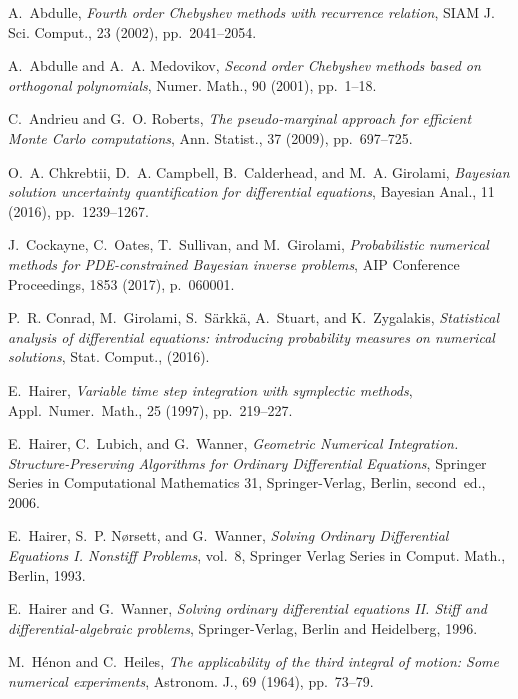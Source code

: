 \documentclass[10pt]{article}
\begin{document}
\def\cprime{$'$}
\begin{thebibliography}{10}
	
	{\sc A.~Abdulle}, {\em Fourth order {C}hebyshev methods with recurrence
		relation}, SIAM J. Sci. Comput., 23 (2002), pp.~2041--2054.
	
	{\sc A.~Abdulle and A.~A. Medovikov}, {\em Second order {C}hebyshev methods
		based on orthogonal polynomials}, Numer. Math., 90 (2001), pp.~1--18.
	
	{\sc C.~Andrieu and G.~O. Roberts}, {\em The pseudo-marginal approach for
		efficient {M}onte {C}arlo computations}, Ann. Statist., 37 (2009),
	pp.~697--725.
	
	{\sc O.~A. Chkrebtii, D.~A. Campbell, B.~Calderhead, and M.~A. Girolami}, {\em
		Bayesian solution uncertainty quantification for differential equations},
	Bayesian Anal., 11 (2016), pp.~1239--1267.
	
	{\sc J.~Cockayne, C.~Oates, T.~Sullivan, and M.~Girolami}, {\em Probabilistic
		numerical methods for {PDE}-constrained {B}ayesian inverse problems}, AIP
	Conference Proceedings, 1853 (2017), p.~060001.
	
	{\sc P.~R. Conrad, M.~Girolami, S.~S{\"a}rkk{\"a}, A.~Stuart, and
		K.~Zygalakis}, {\em Statistical analysis of differential equations:
		introducing probability measures on numerical solutions}, Stat. Comput.,
	(2016).
	
	{\sc E.~Hairer}, {\em Variable time step integration with symplectic methods},
	Appl.\ Numer.\ Math., 25 (1997), pp.~219--227.
	
	{\sc E.~Hairer, C.~Lubich, and G.~Wanner}, {\em Geometric Numerical
		Integration. Structure-Preserving Algorithms for Ordinary Differential
		Equations}, Springer Series in Computational Mathematics 31, Springer-Verlag,
	Berlin, second~ed., 2006.
	
	{\sc E.~Hairer, S.~P. N{\o{}}rsett, and G.~Wanner}, {\em Solving Ordinary
		Differential Equations I. Nonstiff Problems}, vol.~8, Springer Verlag Series
	in Comput. Math., Berlin, 1993.
	
	{\sc E.~Hairer and G.~Wanner}, {\em Solving ordinary differential equations II.
		Stiff and differential-algebraic problems}, Springer-Verlag, Berlin and
	Heidelberg, 1996.
	
	{\sc M.~H\'enon and C.~Heiles}, {\em The applicability of the third integral of
		motion: {S}ome numerical experiments}, Astronom. J., 69 (1964), pp.~73--79.
	

\end{thebibliography}
\end{document}
